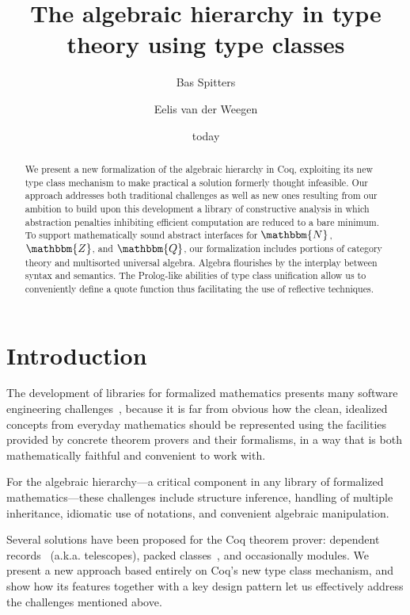 \documentclass[a4paper,10pt,runningheads]{llncs}
\newcommand{\N}{\ensuremath{\mathbbm{N}}}
\newcommand{\Z}{\ensuremath{\mathbbm{Z}}}
\newcommand{\Q}{\ensuremath{\mathbbm{Q}}}
\begin{document}
\title{The algebraic hierarchy in type theory using type classes}
\author{Bas Spitters \and Eelis van der Weegen}
\date{today}
\maketitle
\begin{abstract}
We present a new formalization of the algebraic hierarchy in Coq, exploiting its new type class mechanism to make practical a solution formerly thought infeasible. Our approach addresses both traditional challenges as well as new ones resulting from our ambition to build upon this development a library of constructive analysis in which abstraction penalties inhibiting efficient computation are reduced to a bare minimum. To support mathematically sound abstract interfaces for $\N$, $\Z$, and $\Q$, our formalization includes portions of category theory and multisorted universal algebra.
Algebra flourishes by the interplay between syntax and semantics. The Prolog-like
abilities of type class unification allow us to conveniently define a quote function thus facilitating the use of reflective techniques.
\end{abstract}

\section{Introduction}
The development of libraries for formalized mathematics presents many software engineering challenges~\cite{C-corn,DBLP:conf/types/HaftmannW08}, because it is far from obvious how the clean, idealized concepts from everyday mathematics should be represented using the facilities provided by concrete theorem provers and their formalisms, in a way that is both mathematically faithful and convenient to work with.

For the algebraic hierarchy---a critical component in any library of formalized mathematics---these challenges include structure inference, handling of multiple inheritance, idiomatic use of notations, and convenient algebraic manipulation.

Several solutions have been proposed for the Coq theorem prover: dependent records~\cite{DBLP:journals/jsc/GeuversPWZ02} (a.k.a. telescopes), packed classes~\cite{Packed}, and occasionally modules. We present a new approach based entirely on Coq's new type class mechanism, and show how its features together with a key design pattern let us effectively address the challenges mentioned above.
\end{document}
